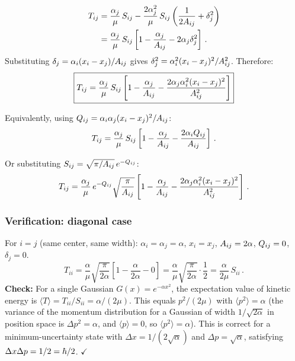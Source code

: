 \begin{align}
  T_{ij} &= \frac{\alpha_j}{\mu}\,S_{ij} - \frac{2\alpha_j^2}{\mu}\,S_{ij}\left(\frac{1}{2A_{ij}}+\delta_j^2\right)\notag\\
  &= \frac{\alpha_j}{\mu}\,S_{ij}\left[1 - \frac{\alpha_j}{A_{ij}} - 2\alpha_j\delta_j^2\right]\,.
\end{align}
Substituting $\delta_j = \alpha_i(x_i-x_j)/A_{ij}$ gives $\delta_j^2 = \alpha_i^2(x_i-x_j)^2/A_{ij}^2$.
Therefore:
\begin{equation}\label{eq:Tij_Gauss}
  \boxed{T_{ij} = \frac{\alpha_j}{\mu}\,S_{ij}\left[1 - \frac{\alpha_j}{A_{ij}} - \frac{2\alpha_j\alpha_i^2(x_i-x_j)^2}{A_{ij}^2}\right]}
\end{equation}

Equivalently, using $Q_{ij} = \alpha_i\alpha_j(x_i-x_j)^2/A_{ij}$:
\begin{equation}
  T_{ij} = \frac{\alpha_j}{\mu}\,S_{ij}\left[1 - \frac{\alpha_j}{A_{ij}} - \frac{2\alpha_iQ_{ij}}{A_{ij}}\right]\,.
\end{equation}

Or substituting $S_{ij} = \sqrt{\pi/A_{ij}}\,e^{-Q_{ij}}$:
\begin{equation}\label{eq:Tij_explicit}
  T_{ij} = \frac{\alpha_j}{\mu}\,e^{-Q_{ij}}\sqrt{\frac{\pi}{A_{ij}}}
  \left[1 - \frac{\alpha_j}{A_{ij}} - \frac{2\alpha_j\alpha_i^2(x_i-x_j)^2}{A_{ij}^2}\right]\,.
\end{equation}

\subsubsection{Verification: diagonal case}

For $i = j$ (same center, same width): $\alpha_i = \alpha_j = \alpha$, $x_i = x_j$,
$A_{ij} = 2\alpha$, $Q_{ij} = 0$, $\delta_j = 0$.
\begin{equation}
  T_{ii} = \frac{\alpha}{\mu}\sqrt{\frac{\pi}{2\alpha}}\left[1 - \frac{\alpha}{2\alpha} - 0\right]
  = \frac{\alpha}{\mu}\sqrt{\frac{\pi}{2\alpha}}\cdot\frac{1}{2}
  = \frac{\alpha}{2\mu}\,S_{ii}\,.
\end{equation}
\textbf{Check:} For a single Gaussian $G(x) = e^{-\alpha x^2}$, the expectation value of kinetic
energy is $\langle T\rangle = T_{ii}/S_{ii} = \alpha/(2\mu)$. This equals $p^2/(2\mu)$ with
$\langle p^2\rangle = \alpha$ (the variance of the momentum distribution for a Gaussian
of width $1/\sqrt{2\alpha}$ in position space is $\Delta p^2 = \alpha$,
and $\langle p\rangle = 0$, so $\langle p^2\rangle = \alpha$).
This is correct for a minimum-uncertainty state with $\Delta x = 1/(2\sqrt{\alpha})$ and
$\Delta p = \sqrt{\alpha}$, satisfying $\Delta x\Delta p = 1/2 = \hbar/2$. $\checkmark$

